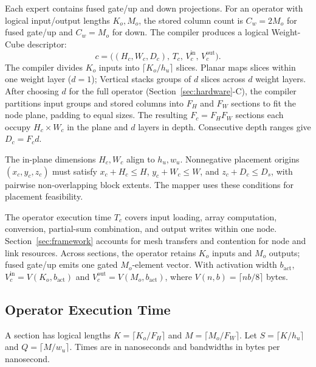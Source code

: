 Each expert contains fused gate/up and down projections. For an operator with logical input/output lengths $K_o,M_o$, the stored column count is $C_w=2M_o$ for fused gate/up and $C_w=M_o$ for down. The compiler produces a logical Weight-Cube descriptor:
\begin{equation}
  c=\big((H_c,W_c,D_c),\,T_c,\,V_c^{\mathrm{in}},\,V_c^{\mathrm{out}}\big).
  \label{eq:weight-cube}
\end{equation}
The compiler divides $K_o$ inputs into $\lceil K_o/h_u\rceil$ slices. Planar maps slices within one weight layer ($d=1$); Vertical stacks groups of $d$ slices across $d$ weight layers. After choosing $d$ for the full operator (Section~\ref{sec:hardware}-C), the compiler partitions input groups and stored columns into $F_H$ and $F_W$ sections to fit the node plane, padding to equal sizes. The resulting $F_c=F_HF_W$ sections each occupy $H_c\times W_c$ in the plane and $d$ layers in depth. Consecutive depth ranges give $D_c=F_cd$.

The in-plane dimensions $H_c,W_c$ align to $h_u,w_u$. Nonnegative placement origins $(x_c,y_c,z_c)$ must satisfy $x_c+H_c\leq H$, $y_c+W_c\leq W$, and $z_c+D_c\leq D_s$, with pairwise non-overlapping block extents. The mapper uses these conditions for placement feasibility.

The operator execution time $T_c$ covers input loading, array computation, conversion, partial-sum combination, and output writes within one node. Section~\ref{sec:framework} accounts for mesh transfers and contention for node and link resources. Across sections, the operator retains $K_o$ inputs and $M_o$ outputs; fused gate/up emits one gated $M_o$-element vector. With activation width $b_{\mathrm{act}}$, $V_c^{\mathrm{in}}=V(K_o,b_{\mathrm{act}})$ and $V_c^{\mathrm{out}}=V(M_o,b_{\mathrm{act}})$, where $V(n,b)=\lceil nb/8\rceil$ bytes.

\subsection{Operator Execution Time}

A section has logical lengths $K=\lceil K_o/F_H\rceil$ and $M=\lceil M_o/F_W\rceil$. Let $S=\lceil K/h_u\rceil$ and $Q=\lceil M/w_u\rceil$. Times are in nanoseconds and bandwidths in bytes per nanosecond.

